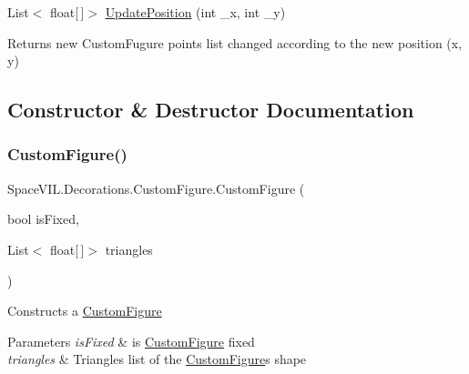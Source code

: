 \begin{DoxyCompactItemize}
List$<$ float\mbox{[}$\,$\mbox{]}$>$ \mbox{\hyperlink{class_space_v_i_l_1_1_decorations_1_1_custom_figure_adb4c9e835ae9daf135f21c8c7133f99c}{Update\+Position}} (int \+\_\+x, int \+\_\+y)
\begin{DoxyCompactList}\small\item\em \begin{DoxyReturn}{Returns}
new Custom\+Fugure points list changed according to the new position (x, y) 
\end{DoxyReturn}
\end{DoxyCompactList}\end{DoxyCompactItemize}


\subsection{Constructor \& Destructor Documentation}
\mbox{\label{class_space_v_i_l_1_1_decorations_1_1_custom_figure_a0177c625ad2cf4b4ea3295b81cfd348b}} 
\subsubsection{\texorpdfstring{Custom\+Figure()}{CustomFigure()}}
{\footnotesize\ttfamily Space\+V\+I\+L.\+Decorations.\+Custom\+Figure.\+Custom\+Figure (\begin{DoxyParamCaption}\item[{bool}]{is\+Fixed,  }\item[{List$<$ float\mbox{[}$\,$\mbox{]}$>$}]{triangles }\end{DoxyParamCaption})\hspace{0.3cm}{\ttfamily [inline]}}



Constructs a \mbox{\hyperlink{class_space_v_i_l_1_1_decorations_1_1_custom_figure}{Custom\+Figure}} 


\begin{DoxyParams}{Parameters}
{\em is\+Fixed} & is \mbox{\hyperlink{class_space_v_i_l_1_1_decorations_1_1_custom_figure}{Custom\+Figure}} fixed \\
\hline
{\em triangles} & Triangles list of the \mbox{\hyperlink{class_space_v_i_l_1_1_decorations_1_1_custom_figure}{Custom\+Figure}}\textquotesingle{}s shape \\
\hline
\end{DoxyParams}


